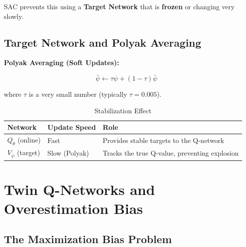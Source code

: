 \documentclass[12pt,a4paper]{article}
\theoremstyle{noteplain}
\theoremstyle{noteexercise}
\begin{document}
SAC prevents this using a \textbf{Target Network} that is \textbf{frozen} or changing very slowly.



\subsection{Target Network and Polyak Averaging}\label{ssec:polyak}



\textbf{Polyak Averaging (Soft Updates):}

\begin{equation}\label{eq:polyak}
\boxed{\bar{\psi} \leftarrow \tau \psi + (1 - \tau)\bar{\psi}}
\end{equation}

where $\tau$ is a very small number (typically $\tau = 0.005$).

\begin{table}[H]
  \centering
  \caption{Stabilization Effect}
  \label{tab:polyak}
  \begin{tabular}{m{4cm}m{3cm}m{5cm}}
    \toprule
    \textbf{Network} & \textbf{Update Speed} & \textbf{Role} \\
    \midrule
    $Q_\theta$ (online) & Fast & Provides stable targets to the Q-network \\
    $V_{\bar{\psi}}$ (target) & Slow (Polyak) & Tracks the true Q-value, preventing explosion \\
    \bottomrule
  \end{tabular}
\end{table}






\section{Twin Q-Networks and Overestimation Bias}\label{sec:twin-q}



\subsection{The Maximization Bias Problem}\label{ssec:max-bias}
\end{document}
